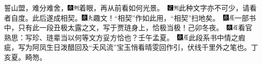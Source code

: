 {誓山盟，难分难舍，{{\includegraphics[width=3mm]{../Images/00004}\includegraphics[width=3mm]{../Images/00011}\footnotesize \kaishu 着眼，再从前看如何光景。}　\includegraphics[width=3mm]{../Images/00006}\includegraphics[width=3mm]{../Images/00011}\footnotesize \kaishu 此种文字亦不可少，请看者自度。}此后遂成相契。{\includegraphics[width=3mm]{../Images/00004}\includegraphics[width=3mm]{../Images/00012}\footnotesize \kaishu 趣文！``相契''作如此用，``相契''扫地矣。　{\includegraphics[width=3mm]{../Images/00004}\includegraphics[width=3mm]{../Images/00010}\footnotesize \kaishu 一部书中，只有此一段丑极太露之文，写于贾琏身上，恰极当极！己卯冬夜。　\includegraphics[width=3mm]{../Images/00004}\includegraphics[width=3mm]{../Images/00010}\footnotesize \kaishu 看官熟思：写珍、琏辈当以何等文方妥方恰也？壬午孟夏。　\includegraphics[width=3mm]{../Images/00004}\includegraphics[width=3mm]{../Images/00010}\footnotesize \kaishu 此段系书中情之瘕疵，写为阿凤生日泼醋回及``夭风流''宝玉悄看晴雯回作引，伏线千里外之笔也。丁亥夏。畸笏。}}

}
